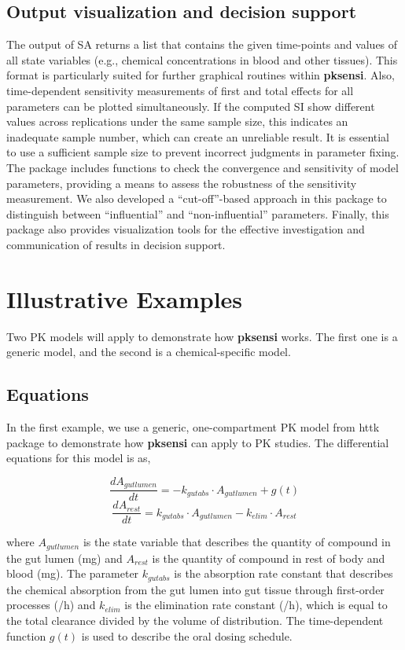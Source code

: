 \documentclass[preprint,12pt, a4paper]{elsarticle}
\begin{document}
\subsection{Output visualization and decision
support}\label{output-visualization-and-decision-support}

The output of SA returns a list that contains the given time-points and
values of all state variables (e.g., chemical concentrations in blood and other tissues).
This format is particularly suited for further graphical routines within
\textbf{pksensi}. Also, time-dependent sensitivity measurements of
first and total effects for all parameters can be plotted
simultaneously. If the computed SI show different values across
replications under the same sample size, this indicates an inadequate
sample number, which can create an unreliable result. It is essential to
use a sufficient sample size to prevent incorrect judgments in parameter
fixing. The package includes functions to check the convergence
and sensitivity of model parameters, providing a means to assess the
robustness of the sensitivity measurement. We also developed a
``cut-off''-based approach in this package to distinguish between
``influential'' and ``non-influential'' parameters. Finally,
this package also provides visualization tools for the effective
investigation and communication of results in decision support.

\section{Illustrative Examples}
\label{}

Two PK models will apply to demonstrate how
\textbf{pksensi} works. The first one is a generic model, and the
second is a chemical-specific model.

\subsection{Equations}
\label{equations}

In the first example, we use a generic, one-compartment PK model from
httk package \cite{JSSv079i04} to demonstrate how
\textbf{pksensi} can apply to PK studies. The differential equations
for this model is as,

\[\frac{dA_{gutlumen}}{dt} = -k_{gutabs} \cdot A_{gutlumen} + g(t)\]
\[\frac{dA_{rest}}{dt} = k_{gutabs} \cdot A_{gutlumen}-k_{elim} \cdot A_{rest}\]

where \(A_{gutlumen}\) is the state variable that describes the quantity
of compound in the gut lumen (mg) and \(A_{rest}\) is the quantity of
compound in rest of body and blood (mg). The parameter \(k_{gutabs}\) is
the absorption rate constant that describes the chemical absorption from
the gut lumen into gut tissue through first-order processes (/h) and
\(k_{elim}\) is the elimination rate constant (/h), which is equal to
the total clearance divided by the volume of distribution. The
time-dependent function \(g(t)\) is used to describe the oral dosing
schedule.
\end{document}
